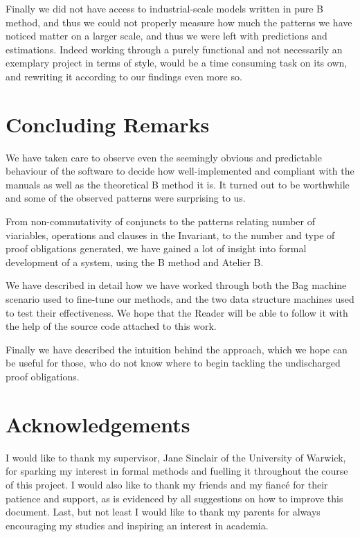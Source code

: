 \documentclass[12pt,journal,duplex]{IEEEtran}
\begin{document}
	Finally we did not have access to industrial-scale models written in pure B method, and thus we could not properly measure how much the patterns we have noticed matter on a larger scale, and thus we were left with predictions and estimations. Indeed working through a purely functional and not necessarily an exemplary project in terms of style, would be a time consuming task on its own, and rewriting it according to our findings even more so.

	\section{Concluding Remarks}

	We have taken care to observe even the seemingly obvious and predictable behaviour of the software to decide how well-implemented and compliant with the manuals as well as the theoretical B method it is. It turned out to be worthwhile and some of the observed patterns were surprising to us.

	From non-commutativity of conjuncts to the patterns relating number of viariables, operations and clauses in the Invariant, to the number and type of proof obligations generated, we have gained a lot of insight into formal development of a system, using the B method and Atelier B.

	We have described in detail how we have worked through both the Bag machine scenario used to fine-tune our methods, and the two data structure machines used to test their effectiveness. We hope that the Reader will be able to follow it with the help of the source code attached to this work.

	Finally we have described the intuition behind the approach, which we hope can be useful for those, who do not know where to begin tackling the undischarged proof obligations.

	\section{Acknowledgements}
	I would like to thank my supervisor, Jane Sinclair of the University of Warwick, for sparking my interest in formal methods and fuelling it throughout the course of this project. I would also like to thank my friends and my fianc\'{e} for their patience and support, as is evidenced by all suggestions on how to improve this document. Last, but not least I would like to thank my parents for always encouraging my studies and inspiring an interest in academia.
\end{document}
